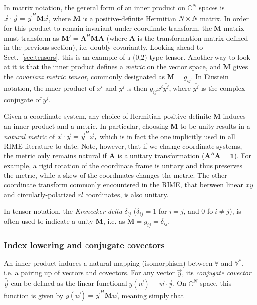 \documentclass{aa}
\newcommand{\herm}{H}
\begin{document}
In matrix notation, the general form of an inner product on $\mathbb{C}^N$ spaces is $\vec x\cdot \vec y = \vec y^\herm \mathbf{M} \vec x$, where $\mathbf{M}$ is a positive-definite Hermitian $N\times N$ matrix. In order for this product to remain invariant under coordinate transform, the $\mathbf{M}$ matrix must transform as $\mathbf{M}'=\mathbf{A}^\herm \mathbf{M} \mathbf{A}$ (where $\mathbf{A}$ is the transformation matrix defined in the previous section), i.e. doubly-covariantly. Looking ahead to Sect.~\ref{sec:tensors}, this is an example of a (0,2)-type tensor. Another way to look at it is that the inner product defines a \emph{metric} on the vector space, and $\mathbf{M}$ gives the \emph{covariant metric tensor}, commonly designated as $\mathbf{M}=g_{ij}$. In Einstein notation, the inner product of $x^i$ and $y^j$ is then $g_{ij} x^i \overline{y^j}$, where $\overline{y^j}$ is the complex conjugate of $y^j$.

Given a coordinate system, any choice of Hermitian positive-definite $\mathbf{M}$ induces an inner product and a metric. In particular, choosing 
$\mathbf{M}$ to be unity results in a \emph{natural metric} of $\vec x \cdot \vec y=\vec y^\herm\vec x,$ which is in fact the one implicitly used in all RIME literature to date. Note, however, that if we change coordinate systems, the metric only remains natural if $\mathbf{A}$ is a unitary transformation ($\mathbf{A}^\herm \mathbf{A}=\mathbf{1}$). For example, a rigid rotation of the coordinate frame is unitary and thus preserves the metric, while a skew of the coordinates changes the metric. The other coordinate transform commonly encountered in the RIME, that between linear $xy$ and circularly-polarized $rl$ coordinates, is also unitary.

In tensor notation, the \emph{Kronecker delta} $\delta_{ij}$ ($\delta_{ij}=1$ for $i=j$, and 0 fo $i\ne j$), is often used to indicate a unity $\mathbf{M}$, i.e. as $\mathbf{M}=g_{ij}=\delta_{ij}.$

 
\subsubsection{Index lowering and conjugate covectors}
\label{sec:index-lowering}

An inner product induces a natural mapping (isomorphism) between $\mathbb{V}$ and $\mathbb{V}^*$, i.e. a pairing up of vectors and covectors.
For any vector $\vec y$, its \emph{conjugate covector} $\bar{\vec y}$ can be defined as the linear functional $\bar y(\vec w) = \vec w \cdot \vec y.$ On $\mathbb{C}^N$ space, this function is given by $\bar y(\vec w) = \vec y^\herm \mathbf{M} \vec w$, meaning simply that
\end{document}
